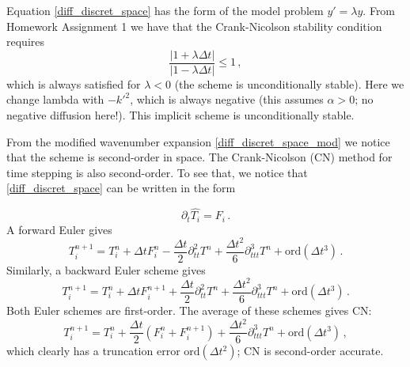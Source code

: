 \documentclass[11pt]{article}
\newcommand{\ord}{\mbox{ord}}
\newcommand{\ii}{\mathrm{i}}
\newcommand{\com}{\, ,}
\newcommand{\per}{\, .}
\def\beq{\begin{equation}}
\def\eeq{\end{equation}}
\begin{document}
\begin{enumerate}[label=(\alph*)]
        Equation \eqref{diff_discret_space} has the form of the model problem $y' = \lambda y$. From Homework Assignment 1 we have that the Crank-Nicolson stability condition requires
        \beq
            \label{cn_cond}
            \frac{|1+\lambda \Delta t|}{|1-\lambda \Delta t|} \leq 1\com
        \eeq
        which is always satisfied for $\lambda < 0$ (the scheme is unconditionally stable). Here we change lambda with $-k'^2$, which is always negative (this assumes $\alpha>0$; no negative diffusion here!). This implicit scheme is unconditionally stable.
    
        From the modified wavenumber expansion  \eqref{diff_discret_space_mod} we notice that the scheme is second-order in space. The Crank-Nicolson (CN) method for time stepping is also second-order. To see that, we notice that \eqref{diff_discret_space} can be written in the form
 
        \begin{equation}
                \partial_t \hat{ T_i} = F_i\per
        \end{equation}
        A forward Euler gives 
        \begin{equation}
            \label{ee_1}
            T_i^{n+1} = T_i^{n} + \Delta t F_i^n -\frac{\Delta t}{2}\partial_{tt}^2 T^{n}  +\frac{\Delta t^2}{6}\partial_{ttt}^3 T^{n} + \ord{(\Delta t^3)} \per
        \end{equation}
        Similarly, a backward Euler scheme gives
        \begin{equation}
            \label{ie_1}
            T_i^{n+1} = T_i^{n} + \Delta t F_i^{n+1}  + \frac{\Delta t}{2}\partial_{tt}^2 T^{n}  +\frac{\Delta t^2}{6}\partial_{ttt}^3 T^{n} + \ord{(\Delta t^3)} \per
        \end{equation}
        Both Euler schemes are first-order. The average of these schemes gives CN:
        \begin{equation}
            \label{cn_1}
            T_i^{n+1} = T_i^{n} + \frac{\Delta t}{2}\left(F_i^n + F_i^{n+1} \right) + \frac{\Delta t^2}{6}\partial_{ttt}^3 T^{n} +\ord{(\Delta t^3)}  \com
        \end{equation}
        which clearly has a truncation error $\ord{(\Delta t^2)}$; CN is second-order accurate. 




\end{enumerate}        


\end{document}
